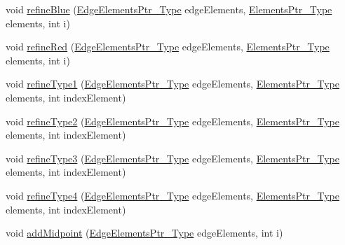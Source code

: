 \begin{DoxyCompactItemize}
\item 
void \hyperlink{classFEDD_1_1RefinementFactory_aeeebbc6bfb22dfb14470cf628400733a}{refine\+Blue} (\hyperlink{classFEDD_1_1RefinementFactory_ae5285e990ec4632d6188a1280627ad13}{Edge\+Elements\+Ptr\+\_\+\+Type} edge\+Elements, \hyperlink{classFEDD_1_1RefinementFactory_a0994b5b7b6d080048673941251999f2e}{Elements\+Ptr\+\_\+\+Type} elements, int i)
\item 
void \hyperlink{classFEDD_1_1RefinementFactory_ad8bc07f5d6bfe7f7180bd32d7cc4ea0c}{refine\+Red} (\hyperlink{classFEDD_1_1RefinementFactory_ae5285e990ec4632d6188a1280627ad13}{Edge\+Elements\+Ptr\+\_\+\+Type} edge\+Elements, \hyperlink{classFEDD_1_1RefinementFactory_a0994b5b7b6d080048673941251999f2e}{Elements\+Ptr\+\_\+\+Type} elements, int i)
\item 
void \hyperlink{classFEDD_1_1RefinementFactory_a89b2f7d45585b804e32b278b83954153}{refine\+Type1} (\hyperlink{classFEDD_1_1RefinementFactory_ae5285e990ec4632d6188a1280627ad13}{Edge\+Elements\+Ptr\+\_\+\+Type} edge\+Elements, \hyperlink{classFEDD_1_1RefinementFactory_a0994b5b7b6d080048673941251999f2e}{Elements\+Ptr\+\_\+\+Type} elements, int index\+Element)
\item 
void \hyperlink{classFEDD_1_1RefinementFactory_ac43c76ce4137963ac5aac1355d38dbac}{refine\+Type2} (\hyperlink{classFEDD_1_1RefinementFactory_ae5285e990ec4632d6188a1280627ad13}{Edge\+Elements\+Ptr\+\_\+\+Type} edge\+Elements, \hyperlink{classFEDD_1_1RefinementFactory_a0994b5b7b6d080048673941251999f2e}{Elements\+Ptr\+\_\+\+Type} elements, int index\+Element)
\item 
void \hyperlink{classFEDD_1_1RefinementFactory_a282ee48e155d2f3f0e0a3faa0fa275d2}{refine\+Type3} (\hyperlink{classFEDD_1_1RefinementFactory_ae5285e990ec4632d6188a1280627ad13}{Edge\+Elements\+Ptr\+\_\+\+Type} edge\+Elements, \hyperlink{classFEDD_1_1RefinementFactory_a0994b5b7b6d080048673941251999f2e}{Elements\+Ptr\+\_\+\+Type} elements, int index\+Element)
\item 
void \hyperlink{classFEDD_1_1RefinementFactory_acb0db07f3517256e51e05380467c9782}{refine\+Type4} (\hyperlink{classFEDD_1_1RefinementFactory_ae5285e990ec4632d6188a1280627ad13}{Edge\+Elements\+Ptr\+\_\+\+Type} edge\+Elements, \hyperlink{classFEDD_1_1RefinementFactory_a0994b5b7b6d080048673941251999f2e}{Elements\+Ptr\+\_\+\+Type} elements, int index\+Element)
\item 
void \hyperlink{classFEDD_1_1RefinementFactory_af40b1acc9353be1408fed4d6a61ed2ae}{add\+Midpoint} (\hyperlink{classFEDD_1_1RefinementFactory_ae5285e990ec4632d6188a1280627ad13}{Edge\+Elements\+Ptr\+\_\+\+Type} edge\+Elements, int i)

\end{DoxyCompactItemize}
